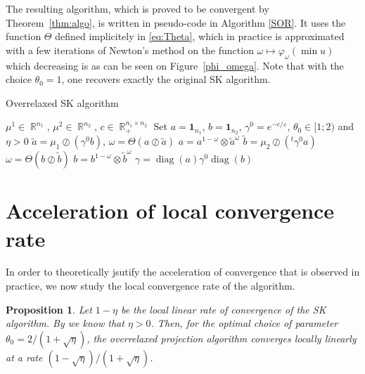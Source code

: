 \documentclass{article} %
\DeclareMathOperator{\IR}{\mathbb{R}}
\DeclareMathOperator{\diag}{diag}
\renewcommand{\epsilon}{\varepsilon}
\theoremstyle{plain}
\newtheorem{proposition}{Proposition}
\theoremstyle{definition}
\theoremstyle{remark}
\begin{document}
The resulting algorithm, which is proved to be convergent by Theorem~\ref{thm:algo}, is written in pseudo-code in Algorithm \ref{SOR}. It uses the function $\Theta$ defined implicitely in \eqref{eq:Theta}, which in practice is approximated with a few iterations of Newton's method on the function $\omega \mapsto \varphi_\omega(\min u)$ which decreasing is as can be seen on Figure~\ref{phi_omega}. Note that with the choice $\theta_0=1$, one recovers exactly the original SK algorithm.

\begin{algorithm}
\caption{Overrelaxed SK algorithm }
\label{SOR}
\begin{algorithmic}
\REQUIRE $\mu^1\in \IR^{n_1}$, $\mu^2\in \IR^{n_2}$, $c\in \IR^{n_1\times n_2}_+$
\STATE Set $a=\mathbf{1}_{n_1}$, $b=\mathbf{1}_{n_2}$, $\gamma^0=e^{-c/\epsilon}$, $\theta_0\in[1;2)$ and $\eta>0$
\STATE $\tilde a=\mu_1\oslash (\gamma^0 b)$, 
\STATE $\omega=\Theta(a\oslash\tilde a)$
\STATE  $a=a^{1-\omega}\otimes \tilde a^\omega$%
\STATE $\tilde b=\mu_2\oslash (^t\gamma^0  a)$
\STATE $\omega=\Theta(b\oslash\tilde b)$
\STATE  $b=b^{1-\omega}\otimes \tilde b^\omega$%
\ENDWHILE
 \RETURN $\gamma=\diag(a)\gamma^0\diag(b)$
\end{algorithmic}
\end{algorithm}



\section{Acceleration of local convergence rate}
\label{section:local}
In order to theoretically jsutify the acceleration of convergence that is observed in practice, we now study the local convergence rate of the algorithm. %

\begin{proposition}\label{prop:local}
Let $1-\eta$ be the local linear rate of convergence of the SK algorithm. By \cite{knight2008sinkhorn} we know that $\eta>0$. Then, for the optimal choice of parameter $\theta_0 = 2/(1+\sqrt{\eta})$, the overrelaxed projection algorithm converges locally linearly at a rate $(1-\sqrt{\eta})/(1+\sqrt{\eta})$.
\end{proposition}
\end{document}

